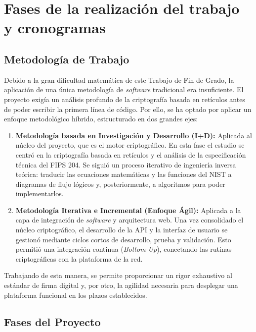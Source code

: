 \documentclass[11pt, a4paper]{report}
\theoremstyle{definition}
\begin{document}
\chapter{Fases de la realización del trabajo y cronogramas}

\section{Metodología de Trabajo}

Debido a la gran dificultad matemática de este Trabajo de Fin de Grado, la aplicación de una única metodología de \textit{software} tradicional era insuficiente. El proyecto exigía un análisis profundo de la criptografía basada en retículos antes de poder escribir la primera línea de código. Por ello, se ha optado por aplicar un enfoque metodológico híbrido, estructurado en dos grandes ejes:

\begin{enumerate}
    \item \textbf{Metodología basada en Investigación y Desarrollo (I+D):} Aplicada al núcleo del proyecto, que es el motor criptográfico. En esta fase el estudio se centró en la criptografía basada en retículos y el análisis de la especificación técnica del FIPS 204. Se siguió un proceso iterativo de ingeniería inversa teórica: traducir las ecuaciones matemáticas y las funciones del NIST a diagramas de flujo lógicos y, posteriormente, a algoritmos para poder implementarlos.
    
    \item \textbf{Metodología Iterativa e Incremental (Enfoque Ágil):} Aplicada a la capa de integración de \textit{software} y arquitectura web. Una vez consolidado el núcleo criptográfico, el desarrollo de la API y la interfaz de usuario se gestionó mediante ciclos cortos de desarrollo, prueba y validación. Esto permitió una integración continua (\textit{Bottom-Up}), conectando las rutinas criptográficas  con la plataforma de la red.
\end{enumerate}

Trabajando de esta manera, se permite proporcionar un rigor exhaustivo al estándar de firma digital y, por otro, la agilidad necesaria para desplegar una plataforma funcional en los plazos establecidos.


\section{Fases del Proyecto}
\end{document}
